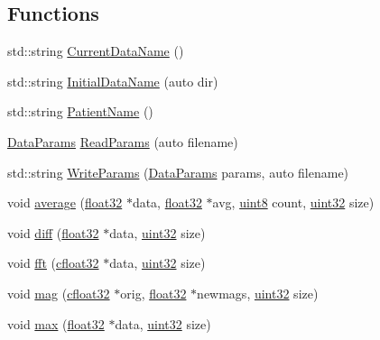 \subsection*{Functions}
\begin{DoxyCompactItemize}
\item 
std\+::string \hyperlink{namespacevaso_abab641a332f2e834dfcdf294c0429426}{Current\+Data\+Name} ()
\item 
std\+::string \hyperlink{namespacevaso_af8f45524d4770053c2b812ce33a7095f}{Initial\+Data\+Name} (auto dir)
\item 
std\+::string \hyperlink{namespacevaso_a21e264fa912f7ca3f50e7e412ba1582e}{Patient\+Name} ()
\item 
\hyperlink{structDataParams}{Data\+Params} \hyperlink{namespacevaso_a6f1a23c617aae2e2c4af5e8016b4d03e}{Read\+Params} (auto filename)
\item 
std\+::string \hyperlink{namespacevaso_ad8543c0caabf3836b4a93a78e0d487d1}{Write\+Params} (\hyperlink{structDataParams}{Data\+Params} params, auto filename)
\item 
void \hyperlink{namespacevaso_a9d0e5d69685ee494d286db6ece005156}{average} (\hyperlink{definitions_8hpp_aacdc525d6f7bddb3ae95d5c311bd06a1}{float32} $\ast$data, \hyperlink{definitions_8hpp_aacdc525d6f7bddb3ae95d5c311bd06a1}{float32} $\ast$avg, \hyperlink{definitions_8hpp_adde6aaee8457bee49c2a92621fe22b79}{uint8} count, \hyperlink{definitions_8hpp_a1134b580f8da4de94ca6b1de4d37975e}{uint32} size)
\item 
void \hyperlink{namespacevaso_a7d108bce812e906d8b1810815774c7ea}{diff} (\hyperlink{definitions_8hpp_aacdc525d6f7bddb3ae95d5c311bd06a1}{float32} $\ast$data, \hyperlink{definitions_8hpp_a1134b580f8da4de94ca6b1de4d37975e}{uint32} size)
\item 
void \hyperlink{namespacevaso_af74f08a8afd7967b6c2b3c2b0e5fb1e9}{fft} (\hyperlink{definitions_8hpp_a960be6b6614c08090c16574dba10a421}{cfloat32} $\ast$data, \hyperlink{definitions_8hpp_a1134b580f8da4de94ca6b1de4d37975e}{uint32} size)
\item 
void \hyperlink{namespacevaso_a5d355b5c326a852e2ce95c258450898c}{mag} (\hyperlink{definitions_8hpp_a960be6b6614c08090c16574dba10a421}{cfloat32} $\ast$orig, \hyperlink{definitions_8hpp_aacdc525d6f7bddb3ae95d5c311bd06a1}{float32} $\ast$newmags, \hyperlink{definitions_8hpp_a1134b580f8da4de94ca6b1de4d37975e}{uint32} size)
\item 
void \hyperlink{namespacevaso_a649803d9dd74002f7975dba6b48b56ce}{max} (\hyperlink{definitions_8hpp_aacdc525d6f7bddb3ae95d5c311bd06a1}{float32} $\ast$data, \hyperlink{definitions_8hpp_a1134b580f8da4de94ca6b1de4d37975e}{uint32} size)

\end{DoxyCompactItemize}

